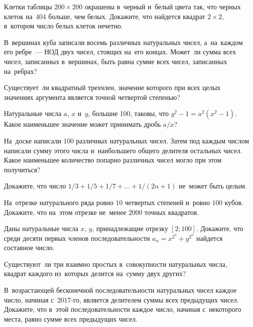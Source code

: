 \begin{problems}

\item
Клетки таблицы $200 \times 200$ окрашены в~черный и~белый цвета так, что черных
клеток на~$404$ больше, чем белых.
Докажите, что найдется квадрат $2 \times 2$, в~котором число белых клеток
нечетно.

\item
В~вершинах куба записали восемь различных натуральных чисел, а~на~каждом его
ребре~--- НОД двух чисел, стоящих на~его концах.
Может~ли сумма всех чисел, записанных в~вершинах, быть равна сумме всех чисел,
записанных на~ребрах?

\item
Существует~ли квадратный трехчлен, значение которого при всех целых
значениях аргумента является точной четвертой степенью?

\item
Натуральные числа $a$, $x$ и~$y$, большие 100, таковы, что
$y^2 - 1 = a^2 (x^2 - 1)$.
Какое наименьшее значение может принимать дробь $a / x$?

\item
На~доске написали 100 различных натуральных чисел.
Затем под каждым числом написали сумму этого числа и~наибольшего общего
делителя остальных чисел.
Какое наименьшее количество попарно различных чисел могло при этом получиться?

\item
Докажите, что число $1/3 + 1/5 + 1/7 + \ldots + 1/(2n+1)$ не~может быть целым.

\item
На~отрезке натурального ряда ровно $10$ четвертых степеней и~ровно $100$ кубов.
Докажите, что на~этом отрезке не~менее $2000$ точных квадратов.

\item
Даны натуральные числа $x$, $y$, принадлежащие отрезку $[2; 100]$.
Докажите, что среди десяти первых членов последовательности
$a_{n} = x^{2^{n}} + y^{2^{n}}$ найдется составное число.

\item
Существуют~ли три взаимно простых в~совокупности натуральных числа, квадрат
каждого из~которых делится на~сумму двух других?

\item
В~возрастающей бесконечной последовательности натуральных чисел каждое число,
начиная с~$2017$-го, является делителем суммы всех предыдущих чисел.
Докажите, что в~этой последовательности каждое число, начиная с~некоторого
места, равно сумме всех предыдущих чисел.

\end{problems}

